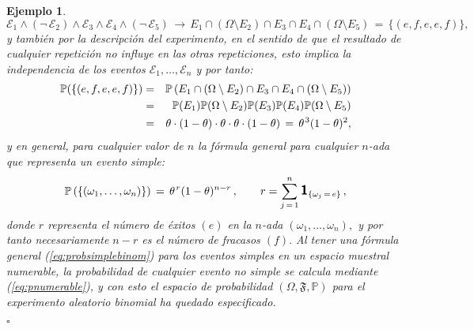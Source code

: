 \documentclass[spanish,10pt,letterpaper]{article}
\newtheorem{ejem}{Ejemplo}
\newcommand{\prob}{\mathbb{P}}
\newcommand{\indic}{\textbf{\textsf{\large{1}}}}
\newcommand{\qed}{\begin{flushright}$\square$\end{flushright}}
\begin{document}
\begin{ejem}
		$$\mathcal{E}_1\wedge(\neg\,\mathcal{E}_2)\wedge\mathcal{E}_3\wedge\mathcal{E}_4\wedge(\neg\,\mathcal{E}_5) \,\longrightarrow\, E_1\cap(\Omega\setminus E_2)\cap E_3\cap E_4\cap(\Omega\setminus E_5) \,=\, \{(e,f,e,e,f)\},$$
		y también por la descripción del experimento, en el sentido de que el resultado de cualquier repetición no influye en las otras repeticiones, esto implica la independencia de los eventos $\mathcal{E}_1,\ldots,\mathcal{E}_n$ y por tanto:
		\begin{eqnarray*}
			\prob(\{(e,f,e,e,f)\}) &=& \prob\left(E_1\cap(\Omega\setminus E_2)\cap E_3\cap E_4\cap(\Omega\setminus E_5)\right) \\
			                       &=& \prob(E_1)\prob(\Omega\setminus E_2)\prob(E_3)\prob(E_4)\prob(\Omega\setminus E_5) \\ 
			                       &=& \theta\cdot(1-\theta)\cdot\theta\cdot\theta\cdot(1-\theta) \,=\, \theta^{\hspace{0.3mm}3}(1-\theta)^2,
		\end{eqnarray*}
		y en general, para cualquier valor de $n$ la fórmula general para cualquier $n$-ada que representa un evento simple:
		\begin{equation}\label{eq:probsimplebinom}
			\prob\left(\{(\omega_1,\ldots,\omega_n)\}\right) \,=\, \theta^{\hspace{0.3mm}r}(1-\theta)^{n-r}\,, \qquad r = \sum_{j\,=\,1}^n\indic_{\{\omega_j\,=\,e\}}\,,
		\end{equation}
		donde $r$ representa el número de éxitos $(e)$ en la $n$-ada $(\omega_1,\ldots,\omega_n),$ y por tanto necesariamente $n-r$ es el número de fracasos $(f).$ Al tener una fórmula general (\ref{eq:probsimplebinom}) para los eventos simples en un espacio muestral numerable, la probabilidad de cualquier evento no simple se calcula mediante (\ref{eq:pnumerable}), y con esto el espacio de probabilidad $(\Omega,\mathfrak{F},\prob)$ para el experimento aleatorio binomial ha quedado especificado. \qed 
	\end{ejem}
	
\end{document}
